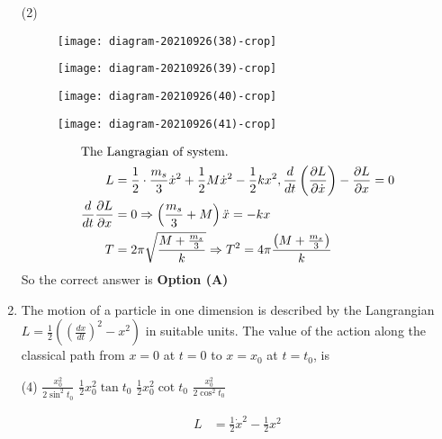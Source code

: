 \begin{enumerate}
	{}
	\begin{tasks}(2)
		\task[\textbf{A.}] \begin{figure}[H]
			\centering
			\texttt{[image: diagram-20210926(38)-crop]}
		\end{figure}
		\task[\textbf{B.}] \begin{figure}[H]
			\centering
			\texttt{[image: diagram-20210926(39)-crop]}
		\end{figure}
		\task[\textbf{C.}] \begin{figure}[H]
			\centering
			\texttt{[image: diagram-20210926(40)-crop]}
		\end{figure}
		\task[\textbf{D.}] \begin{figure}[H]
			\centering
			\texttt{[image: diagram-20210926(41)-crop]}
		\end{figure}
	\end{tasks}	
\begin{answer}
	\begin{align*}
	\intertext{The Langragian of system.}
	L&=\frac{1}{2} \cdot \frac{m_{s}}{3} \dot{x}^{2}+\frac{1}{2} M \dot{x}^{2}-\frac{1}{2} k x^{2}, \frac{d}{d t}\left(\frac{\partial L}{\partial \dot{x}}\right)-\frac{\partial L}{\partial x}=0\\
	\frac{d}{d t} \frac{\partial L}{\partial x}&=0 \Rightarrow\left(\frac{m_{s}}{3}+M\right) \ddot{x}=-k x\\
	T&=2 \pi \sqrt{\frac{M+\frac{m_{s}}{3}}{k}} \Rightarrow T^{2}=4 \pi \frac{\left(M+\frac{m_{s}}{3}\right)}{k}
	\end{align*}
	So the correct answer is \textbf{Option (A)}
\end{answer}
	\item The motion of a particle in one dimension is described by the Langrangian $L=\frac{1}{2}\left(\left(\frac{d x}{d t}\right)^{2}-x^{2}\right)$ in suitable units. The value of the action along the classical path from $x=0$ at $t=0$ to $x=x_{0}$ at $t=t_{0}$, is
	{}
	\begin{tasks}(4)
		\task[\textbf{A.}] $\frac{x_{0}^{2}}{2 \sin ^{2} t_{0}}$
		\task[\textbf{B.}] $\frac{1}{2} x_{0}^{2} \tan t_{0}$
		\task[\textbf{C.}] $\frac{1}{2} x_{0}^{2} \cot t_{0}$
		\task[\textbf{D.}] $\frac{x_{0}^{2}}{2 \cos ^{2} t_{0}}$
	\end{tasks}	
\begin{answer}
	\begin{align*}
	L&=\frac{1}{2} \dot{x}^{2}-\frac{1}{2} x^{2}\\

\end{align*}
\end{answer}
\end{enumerate}
